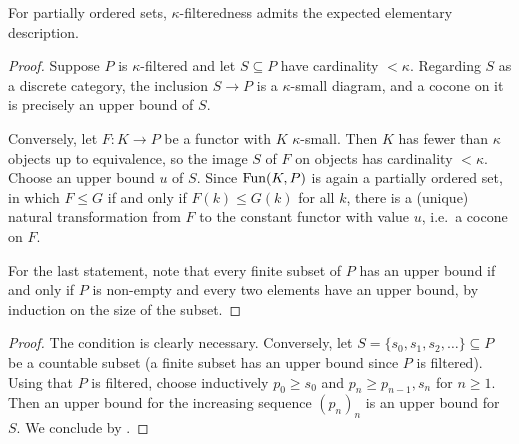 	For partially ordered sets, $\kappa$-filteredness admits the expected elementary description.

	\begin{proof}
		Suppose $P$ is $\kappa$-filtered and let $S \subseteq P$ have cardinality $< \kappa$. Regarding $S$ as a discrete category, the inclusion $S \to P$ is a $\kappa$-small diagram, and a cocone on it is precisely an upper bound of $S$.

		Conversely, let $F\colon K \to P$ be a functor with $K$ $\kappa$-small. Then $K$ has fewer than $\kappa$ objects up to equivalence, so the image $S$ of $F$ on objects has cardinality $< \kappa$. Choose an upper bound $u$ of $S$. Since $\operatorname{Fun}(K,P)$ is again a partially ordered set, in which $F \leq G$ if and only if $F(k) \leq G(k)$ for all $k$, there is a (unique) natural transformation from $F$ to the constant functor with value $u$, i.e.\ a cocone on $F$.

		For the last statement, note that every finite subset of $P$ has an upper bound if and only if $P$ is non-empty and every two elements have an upper bound, by induction on the size of the subset.
	\end{proof}

	\begin{proof}
		The condition is clearly necessary. Conversely, let $S = \{s_0,s_1,s_2,\dots\} \subseteq P$ be a countable subset (a finite subset has an upper bound since $P$ is filtered). Using that $P$ is filtered, choose inductively $p_0 \geq s_0$ and $p_n \geq p_{n-1}, s_n$ for $n \geq 1$. Then an upper bound for the increasing sequence $(p_n)_n$ is an upper bound for $S$. We conclude by .
	\end{proof}

